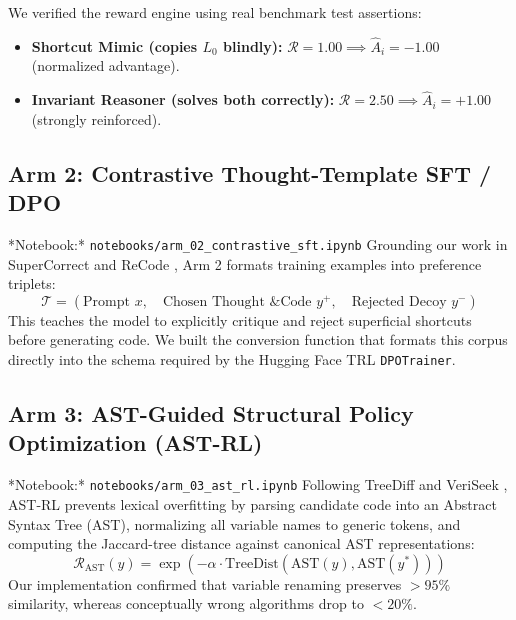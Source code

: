 \documentclass[12pt, a4paper]{article}
\begin{document}
We verified the reward engine using real benchmark test assertions:
\begin{itemize}
  \item \textbf{Shortcut Mimic (copies $L_0$ blindly):} $\mathcal{R} = 1.00 \implies \hat{A}_i = -1.00$ (normalized advantage).
  \item \textbf{Invariant Reasoner (solves both correctly):} $\mathcal{R} = 2.50 \implies \hat{A}_i = +1.00$ (strongly reinforced).
\end{itemize}

\subsection{Arm 2: Contrastive Thought-Template SFT / DPO}
*Notebook:* \texttt{notebooks/arm\_02\_contrastive\_sft.ipynb}  
Grounding our work in SuperCorrect \cite{supercorrect} and ReCode \cite{recode_contrastive}, Arm 2 formats training examples into preference triplets:
\begin{equation}
\mathcal{T} = \left( \text{Prompt } x, \quad \text{Chosen Thought \& Code } y^+, \quad \text{Rejected Decoy } y^- \right)
\end{equation}
This teaches the model to explicitly critique and reject superficial shortcuts before generating code. We built the conversion function that formats this corpus directly into the schema required by the Hugging Face TRL \texttt{DPOTrainer}.

\subsection{Arm 3: AST-Guided Structural Policy Optimization (AST-RL)}
*Notebook:* \texttt{notebooks/arm\_03\_ast\_rl.ipynb}  
Following TreeDiff \cite{treediff} and VeriSeek \cite{veriseek}, AST-RL prevents lexical overfitting by parsing candidate code into an Abstract Syntax Tree (AST), normalizing all variable names to generic tokens, and computing the Jaccard-tree distance against canonical AST representations:
\begin{equation}
\mathcal{R}_{\text{AST}}(y) = \exp\left( -\alpha \cdot \text{TreeDist}(\text{AST}(y), \text{AST}(y^*)) \right)
\end{equation}
Our implementation confirmed that variable renaming preserves $>95\%$ similarity, whereas conceptually wrong algorithms drop to $<20\%$.
\end{document}
